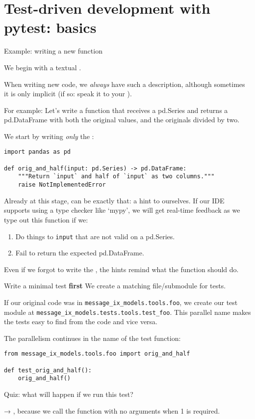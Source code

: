 \documentclass[12pt,aspectratio=169]{beamer}
\begin{document}
\section{Test-driven development with pytest: basics}
\begin{frame}{Example: writing a new function}

We begin with a textual .

\medskip
When writing new code, we \emph{always} have such a description, although sometimes it is only implicit (if so: speak it to your ).

\medskip
For example: Let's write a function that receives a pd.Series and returns a pd.DataFrame with both the original values, and the originals divided by two.

\framebreak
We start by writing \emph{only} the :
\begin{verbatim}
import pandas as pd

def orig_and_half(input: pd.Series) -> pd.DataFrame:
    """Return `input` and half of `input` as two columns."""
    raise NotImplementedError
\end{verbatim}
Already at this stage,  can be exactly that: a hint to ourselves.
If our IDE supports using a type checker like `mypy', we will get real-time feedback as we type out this function if we:
\begin{enumerate}
  \item Do things to \verb|input| that are not valid on a pd.Series.
  \item Fail to return the expected pd.DataFrame.
\end{enumerate}

Even if we forgot to write the , the hints remind what the function should do.
\end{frame}

\begin{frame}[fragile]{Write a minimal test \textbf{first}}
We  create a matching file/submodule for tests.

\medskip
If our original code was in \verb|message_ix_models.tools.foo|, we create our test module at \verb|message_ix_models.tests.tools.test_foo|. This parallel name makes the tests easy to find from the code and vice versa.

\medskip
The parallelism continues in the name of the test function:
\begin{verbatim}
from message_ix_models.tools.foo import orig_and_half

def test_orig_and_half():
    orig_and_half()
\end{verbatim}

\medskip
Quiz: what will happen if we run this test?\pause

→ , because we call the function with no arguments when 1 is required.
\end{frame}
\end{document}
